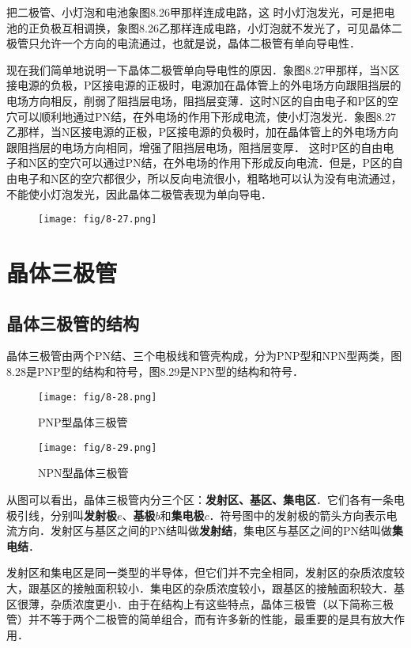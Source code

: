 把二极管、小灯泡和电池象图8.26甲那样连成电路，这
时小灯泡发光，可是把电池的正负极互相调换，象图8.26乙那样连成电路，小灯泡就不发光了，可见晶体二极管只允许一个方向的电流通过，也就是说，晶体二极管有单向导电性．

现在我们简单地说明一下晶体二极管单向导电性的原因．象图8.27甲那样，当N区接电源的负极，P区接电源的正极时，电源加在晶体管上的外电场方向跟阻挡层的电场方向相反，削弱了阻挡层电场，阻挡层变薄．这时N区的自由电子和P区的空穴可以顺利地通过PN结，在外电场的作用下形成电流，使小灯泡发光．象图8.27乙那样，当N区接电源的正极，P区接电源的负极时，加在晶体管上的外电场方向跟阻挡层的电场方向相同，增强了阻挡层电场，阻挡层变厚．
这时P区的自由电子和N区的空穴可以通过PN结，在外电场的作用下形成反向电流．但是，P区的自由电子和N区的空穴都很少，所以反向电流很小，粗略地可以认为没有电流通过，不能使小灯泡发光，因此晶体二极管表现为单向导电．
\begin{figure}[htp]\centering
    \texttt{[image: fig/8-27.png]}
    \caption{}
    \end{figure}

\section{晶体三极管}

\subsection{晶体三极管的结构}

晶体三极管由两个PN结、三个电极线和管壳构成，分为PNP型和NPN型两类，图8.28是PNP型的结构和符号，图8.29是NPN型的结构和符号．
\begin{figure}[htp]\centering
    \texttt{[image: fig/8-28.png]}
    \caption{PNP型晶体三极管}
    \end{figure}

    \begin{figure}[htp]\centering
        \texttt{[image: fig/8-29.png]}
        \caption{NPN型晶体三极管}
        \end{figure}

从图可以看出，晶体三极管内分三个区：\textbf{发射区、基区、集电区}．它们各有一条电极引线，分别叫\textbf{发射极$e$}、\textbf{基极$b$}和\textbf{集电极$c$}．符号图中的发射极的箭头方向表示电流方向．发射区与基区之间的PN结叫做\textbf{发射结}，集电区与基区之间的PN结叫做\textbf{集电结}．

发射区和集电区是同一类型的半导体，但它们并不完全相同，发射区的杂质浓度较大，跟基区的接触面积较小．集电区的杂质浓度较小，跟基区的接触面积较大．基区很薄，杂质浓度更小．由于在结构上有这些特点，晶体三极管（以下简称三极管）并不等于两个二极管的简单组合，而有许多新的性能，最重要的是具有放大作用．

